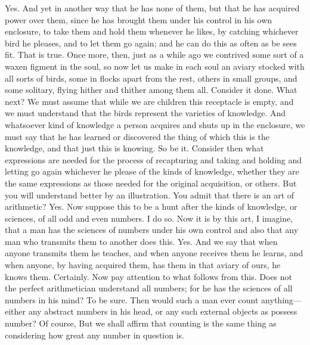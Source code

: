 \documentclass[letterpaper,12pt]{article}
\newcommand{\stephpag}[1]{\marginnote{\small\itshape\fontfamily{ppl}\selectfont #1}}
\begin{document}
\begin{drama}
\theaetetusspeaks
Yes.
\socratesspeaks
And yet in another way that he has none of them, but that he has acquired power over them, since he has brought them under his control in his own enclosure, \stephpag{d} to take them and hold them whenever he likes, by catching whichever bird he pleases, and to let them go again; and he can do this as often as be sees fit.
\theaetetusspeaks
That is true.
\socratesspeaks
Once more, then, just as a while ago we contrived some sort of a waxen figment in the soul, so now let us make in each soul an aviary stocked with all sorts of birds, some in flocks apart from the rest, others in small groups, and some solitary, flying hither and thither among them all. \stephpag{e}
\theaetetusspeaks
Consider it done. What next?
\socratesspeaks
We must assume that while we are children this receptacle is empty, and we must understand that the birds represent the varieties of knowledge. And whatsoever kind of knowledge a person acquires and shuts up in the enclosure, we must say that he has learned or discovered the thing of which this is the knowledge, and that just this is knowing.
\theaetetusspeaks
So be it. \stephpag{198 a}
\socratesspeaks
Consider then what expressions are needed for the process of recapturing and taking and holding and letting go again whichever he please of the kinds of knowledge, whether they are the same expressions as those needed for the original acquisition, or others. But you will understand better by an illustration. You admit that there is an art of arithmetic?
\theaetetusspeaks
Yes.
\socratesspeaks
Now suppose this to be a hunt after the kinds of knowledge, or sciences, of all odd and even numbers.
\theaetetusspeaks
I do so.
\socratesspeaks
Now it is by this art, I imagine, that a man has \stephpag{b} the sciences of numbers under his own control and also that any man who transmits them to another does this.
\theaetetusspeaks
Yes.
\socratesspeaks
And we say that when anyone transmits them he teaches, and when anyone receives them he learns, and when anyone, by having acquired them, has them in that aviary of ours, he knows them.
\theaetetusspeaks
Certainly.
\socratesspeaks
Now pay attention to what follows from this. Does not the perfect arithmetician understand all numbers; for he has the sciences of all numbers in his mind?
\theaetetusspeaks
To be sure. \stephpag{c}
\socratesspeaks
Then would such a man ever count anything—either any abstract numbers in his head, or any such external objects as possess number?
\theaetetusspeaks
Of course,
\socratesspeaks
But we shall affirm that counting is the same thing as considering how great any number in question is.

\end{drama}
\end{document}
